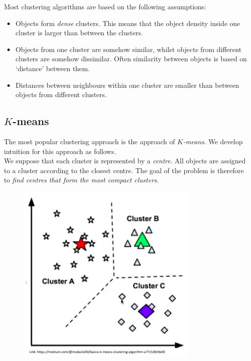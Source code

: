 Most clustering algorithms are based on the following assumptions:
\begin{itemize}
\item Objects form \textit{dense} clusters. This means that the object density inside one cluster is larger than between the clusters.
\item Objects from one cluster are somehow similar, whilst objects from different clusters are somehow dissimilar. Often similarity between objects is based on `distance' between them.
\item Distances between neighbours within one cluster are smaller than between objects from different clusters.
\end{itemize}



\newpage
\subsection{$K$-means}
The most popular clustering approach is the approach of \textit{$K$-means}. We develop intuition for this approach as follows.\\

We suppose that each cluster is represented by a \textit{centre}. All objects are assigned to a cluster according to the closest centre. The goal of the problem is therefore to \textit{find centres that form the most compact clusters}.
\begin{figure}[H]
\centering
\includegraphics[scale=0.4]{kmeans.png}
\end{figure}

